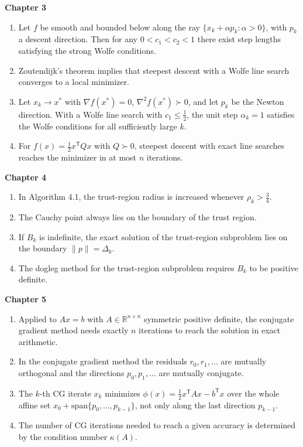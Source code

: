 \documentclass[11pt,a4paper]{article}
\newcommand{\R}{\mathbb{R}}
\newcommand{\T}{^{\mathsf T}}
\newcommand{\gradf}{\nabla f}
\newcommand{\hessf}{\nabla^{2} f}
\begin{document}
\textbf{Chapter 3}
\begin{enumerate}[resume]
\item Let $f$ be smooth and bounded below along the ray $\{x_{k}+\alpha p_{k}:\alpha>0\}$, with $p_{k}$ a descent direction. Then for any $0<c_{1}<c_{2}<1$ there exist step lengths satisfying the strong Wolfe conditions.

\item Zoutendijk's theorem implies that steepest descent with a Wolfe line search converges to a local minimizer.

\item Let $x_{k}\to x^{*}$ with $\gradf(x^{*})=0$, $\hessf(x^{*})\succ0$, and let $p_{k}$ be the Newton direction. With a Wolfe line search with $c_{1}\le\tfrac12$, the unit step $\alpha_{k}=1$ satisfies the Wolfe conditions for all sufficiently large $k$.

\item For $f(x)=\tfrac12x\T Qx$ with $Q\succ0$, steepest descent with exact line searches reaches the minimizer in at most $n$ iterations.
\end{enumerate}

\textbf{Chapter 4}
\begin{enumerate}[resume]
\item In Algorithm 4.1, the trust-region radius is increased whenever $\rho_{k}>\tfrac34$.

\item The Cauchy point always lies on the boundary of the trust region.

\item If $B_{k}$ is indefinite, the exact solution of the trust-region subproblem lies on the boundary $\|p\|=\Delta_{k}$.

\item The dogleg method for the trust-region subproblem requires $B_{k}$ to be positive definite.
\end{enumerate}

\textbf{Chapter 5}
\begin{enumerate}[resume]
\item Applied to $Ax=b$ with $A\in\R^{n\times n}$ symmetric positive definite, the conjugate gradient method needs exactly $n$ iterations to reach the solution in exact arithmetic.

\item In the conjugate gradient method the residuals $r_{0},r_{1},\dots$ are mutually orthogonal and the directions $p_{0},p_{1},\dots$ are mutually conjugate.

\item The $k$-th CG iterate $x_{k}$ minimizes $\phi(x)=\tfrac12x\T Ax-b\T x$ over the whole affine set $x_{0}+\mathrm{span}\{p_{0},\dots,p_{k-1}\}$, not only along the last direction $p_{k-1}$.

\item The number of CG iterations needed to reach a given accuracy is determined by the condition number $\kappa(A)$.
\end{enumerate}
\end{document}
